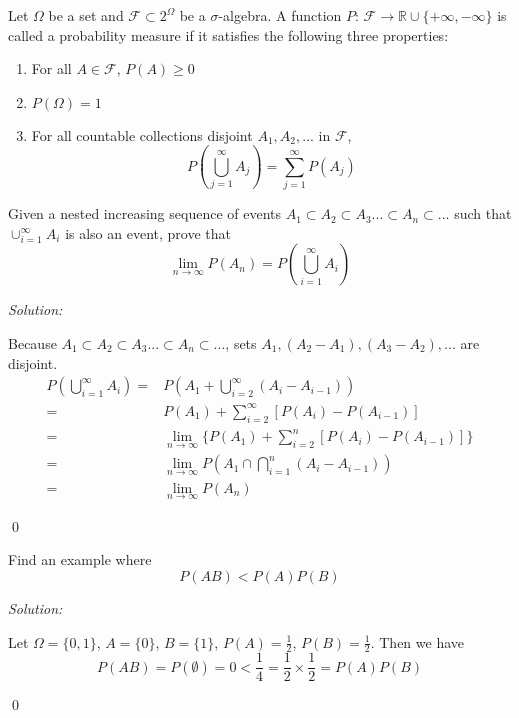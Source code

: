 \documentclass[12pt]{article}
\newenvironment{problem}[2][Problem]{\begin{trivlist}
\item[\hskip \labelsep {\bfseries #1}\hskip \labelsep {\bfseries #2.}]}{\end{trivlist}}
\newenvironment{sol}
    {\emph{Solution:}
    }
    {
    \qed
    }
\begin{document}
\begin{problem}{5}
Let $\Omega$ be a set and $\mathscr{F}\subset2^{\Omega}$ be a $\sigma$-algebra. A function $P$: $\mathscr{F}\to \mathbb{R}\cup \{+\infty,-\infty\}$ is called a probability measure if it satisfies the following three properties:
\begin{enumerate}
    \item For all $A\in \mathscr{F}$, $P(A)\geq 0$
    \item $P(\Omega)=1$
    \item For all countable collections disjoint $A_1,A_2,...$ in $\mathscr{F}$,
    \[P(\bigcup_{j=1}^{\infty}A_j)=\sum_{j=1}^{\infty} P(A_j)\]
\end{enumerate}
Given a nested increasing sequence of events $A_1\subset A_2\subset A_3 ... \subset A_n \subset ...$ such that $\cup_{i=1}^{\infty}A_i$ is also an event, prove that $$\lim_{n\to \infty}P(A_n)=P(\bigcup_{i=1}^{\infty}A_i)$$
\end{problem}
\begin{sol}
Because $A_1\subset A_2\subset A_3 ... \subset A_n \subset ...$, sets $A_1, (A_2-A_1), (A_3-A_2), ...$ are disjoint.
\begin{align*}
P(\bigcup_{i=1}^{\infty}A_i)=&P(A_1+\bigcup_{i=2}^{\infty}(A_i-A_{i-1}))\\
=&P(A_1)+\sum_{i=2}^{\infty}[P(A_i)-P(A_{i-1})]\\
=&\lim_{n\to\infty}\{P(A_1)+\sum_{i=2}^n[P(A_i)-P(A_{i-1})]\}\\
=&\lim_{n\to\infty}P(A_1\cap\bigcap_{i=1}^n(A_i-A_{i-1}))\\
=&\lim_{n\to\infty}P(A_n)
\end{align*}
\end{sol}



\begin{problem}{6}
Find an example where $$P(AB) < P(A)P(B)$$

\end{problem}
\begin{sol}
Let $\Omega=\{0,1\}$, $A=\{0\}$, $B=\{1\}$, $P(A)=\frac{1}{2}$, $P(B)=\frac{1}{2}$. Then we have
\[
P(AB)=P(\emptyset)=0<\frac{1}{4}=\frac{1}{2}\times\frac{1}{2}=P(A)P(B)
\]
\end{sol}
\end{document}
